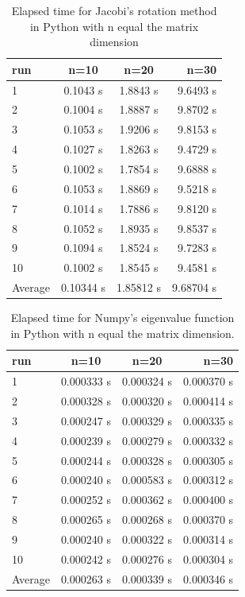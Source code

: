 \documentclass{article}
\begin{document}
\begin{table}[H]
    \centering
    \begin{tabular}{|l|c|c|r|}
    \hline
     run & n=10 & n=20 & n=30\\
     \hline
      1  & 0.1043 s & 1.8843 s & 9.6493 s\\
      2  & 0.1004 s & 1.8887 s & 9.8702 s\\
      3  & 0.1053 s & 1.9206 s & 9.8153 s\\
      4  & 0.1027 s & 1.8263 s & 9.4729 s\\
      5  & 0.1002 s & 1.7854 s & 9.6888 s\\
      6  & 0.1053 s & 1.8869 s & 9.5218 s\\
      7  & 0.1014 s & 1.7886 s & 9.8120 s\\
      8  & 0.1052 s & 1.8935 s & 9.8537 s\\
      9  & 0.1094 s & 1.8524 s & 9.7283 s\\
      10 & 0.1002 s & 1.8545 s & 9.4581 s\\
      \hline
      Average & 0.10344 s & 1.85812  s & 9.68704 s\\
      \hline
    \end{tabular}
    \caption{Elapsed time for Jacobi's rotation method in Python with n equal the matrix dimension}
    \label{timeusedjacobi}
\end{table}

\begin{table}[H]
    \centering
    \begin{tabular}{|l|c|c|r|}
    \hline
     run & n=10 & n=20 & n=30 \\
     \hline
      1  & 0.000333 s & 0.000324 s & 0.000370 s\\
      2  & 0.000328 s & 0.000320 s & 0.000414 s\\
      3  & 0.000247 s & 0.000329 s & 0.000335 s\\
      4  & 0.000239 s & 0.000279 s & 0.000332 s\\
      5  & 0.000244 s & 0.000328 s & 0.000305 s\\
      6  & 0.000240 s & 0.000583 s & 0.000312 s\\
      7  & 0.000252 s & 0.000362 s & 0.000400 s\\
      8  & 0.000265 s & 0.000268 s & 0.000370 s\\
      9  & 0.000240 s & 0.000322 s & 0.000314 s\\
      10 & 0.000242 s & 0.000276 s & 0.000304 s\\
      \hline
      Average & 0.000263 s & 0.000339 s & 0.000346 s\\
      \hline
    \end{tabular}
    \caption{Elapsed time for Numpy's eigenvalue function in Python with n equal the matrix dimension.}
    \label{timeusednumpy}
\end{table}
\end{document}
